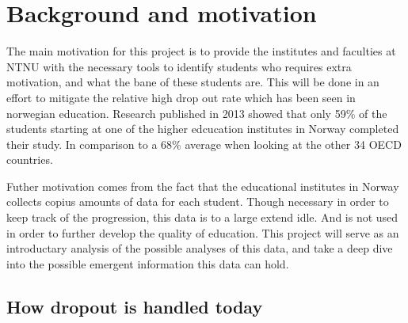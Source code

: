 \section{Background and motivation}
	The main motivation for this project is to provide the institutes and faculties at NTNU 
	with the necessary tools to identify students who requires extra motivation, and what the bane of these students are.
	This will be done in an effort to mitigate the relative high drop out rate which has been
	seen in norwegian education.
	Research published in 2013 showed that only 59\% of the students
	starting at one of the higher edcucation institutes in Norway completed their study.
	In comparison to a 68\% average when looking at the other 34 OECD countries.\cite{OECD2013}
	
	Futher motivation comes from the fact that the educational institutes in Norway collects
	copius amounts of data for each student. Though necessary in order to keep track of the progression, 
	this data is to a large extend idle. And is not used in order to further develop the quality of education. 
	This project will serve as an introductary analysis of the possible analyses of this data, 
	and take a deep dive into the possible emergent information this data can hold. 
	
\subsection{How dropout is handled today}
	

	